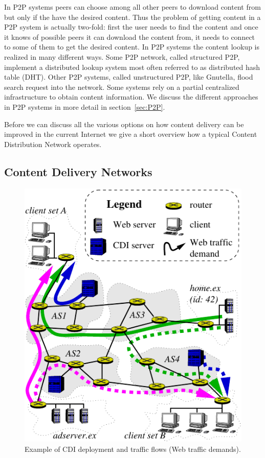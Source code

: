 In P2P systems peers can choose among all other peers to download content from
but only if the have the desired content. Thus the problem of getting content
in a P2P system is actually two-fold: first the user needs to find the content
and once it knows of possible peers it can download the content from, it needs
to connect to some of them to get the desired content.  In P2P systems the
content lookup is realized in many different ways. Some P2P network, called
structured P2P, implement a distributed lookup system most often referred to as
distributed hash table (DHT). Other P2P systems, called unstructured P2P, like
Gnutella, flood search request into the network.  Some systems rely on a
partial centralized infrastructure to obtain content information. We discuss
the different approaches in P2P systems in more detail in
section~\ref{sec:P2P}.

Before we can discuss all the various options on how content delivery can be
improved in the current Internet we give a short overview how a typical Content
Distribution Network operates.


\subsection{Content Delivery Networks} \label{sec:content_delivery}

\begin{figure} \begin{center}
\includegraphics[width=0.7\linewidth]{figures-pdf/flows-example} 
\end{center}
\caption{Example of CDI deployment and traffic flows (Web traffic demands).}
\label{fig:aka:cdn} \end{figure}

